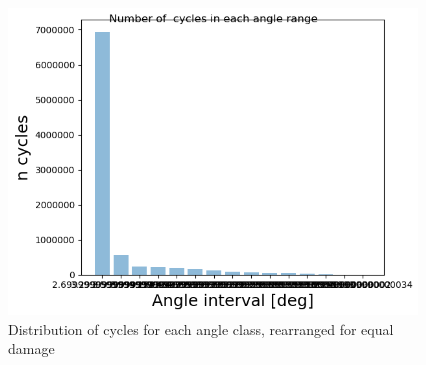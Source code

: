 \begin{figure}[H]
\centering
\includegraphics[scale=1]{figures/newcyc}
\caption[Distribution of cycles for each angle class, rearranged for equal damage]{Distribution of cycles for each angle class, rearranged for equal damage}
 \label{fig:newcyc}
\end{figure}

